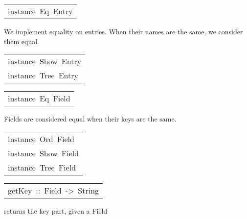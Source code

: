 \begin{haddockdesc}
\item[\begin{tabular}{@{}l}
instance\ Eq\ Entry
\end{tabular}]\haddockbegindoc
We implement equality on entries. When their names are the same, we consider them equal.
\par

\end{haddockdesc}
\begin{haddockdesc}
\item[\begin{tabular}{@{}l}
instance\ Show\ Entry\\instance\ Tree\ Entry
\end{tabular}]
\end{haddockdesc}
\begin{haddockdesc}
\item[\begin{tabular}{@{}l}
instance\ Eq\ Field
\end{tabular}]\haddockbegindoc
Fields are considered equal when their keys are the same.
\par

\end{haddockdesc}
\begin{haddockdesc}
\item[\begin{tabular}{@{}l}
instance\ Ord\ Field\\instance\ Show\ Field\\instance\ Tree\ Field
\end{tabular}]
\end{haddockdesc}
\begin{haddockdesc}
\item[\begin{tabular}{@{}l}
getKey\ ::\ Field\ ->\ String
\end{tabular}]\haddockbegindoc
returns the key part, given a Field
\par

\end{haddockdesc}
